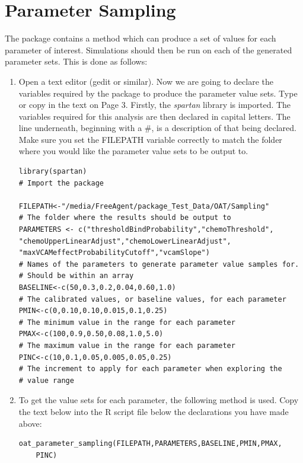 \documentclass[a4paper,11pt]{article}
\begin{document}
\section{Parameter Sampling}
\noindent The package contains a method which can produce a set of values for each parameter of interest. Simulations should then be run on each of the generated parameter sets.  This is done as follows:\\
\begin{enumerate}
\item Open a text editor (gedit or similar).  Now we are going to declare the variables required by the package to produce the parameter value sets. Type or copy in the text on Page 3. Firstly, the \textit{spartan} library is imported. The variables required for this analysis are then declared in capital letters. The line underneath, beginning with a \#, is a description of that being declared. Make sure you set the FILEPATH variable correctly to match the folder where you would like the parameter value sets to be output to.

\newpage

\begin{verbatim}
library(spartan)
# Import the package

FILEPATH<-"/media/FreeAgent/package_Test_Data/OAT/Sampling"
# The folder where the results should be output to
PARAMETERS <- c("thresholdBindProbability","chemoThreshold",
"chemoUpperLinearAdjust","chemoLowerLinearAdjust",
"maxVCAMeffectProbabilityCutoff","vcamSlope")
# Names of the parameters to generate parameter value samples for.
# Should be within an array
BASELINE<-c(50,0.3,0.2,0.04,0.60,1.0)
# The calibrated values, or baseline values, for each parameter
PMIN<-c(0,0.10,0.10,0.015,0.1,0.25) 
# The minimum value in the range for each parameter
PMAX<-c(100,0.9,0.50,0.08,1.0,5.0)
# The maximum value in the range for each parameter
PINC<-c(10,0.1,0.05,0.005,0.05,0.25)
# The increment to apply for each parameter when exploring the
# value range

\end{verbatim}

\item To get the value sets for each parameter, the following method is used. Copy the text below into the R script file below the declarations you have made above:

\begin{verbatim}
oat_parameter_sampling(FILEPATH,PARAMETERS,BASELINE,PMIN,PMAX,
	PINC)
\end{verbatim}


\end{enumerate}
\end{document}

